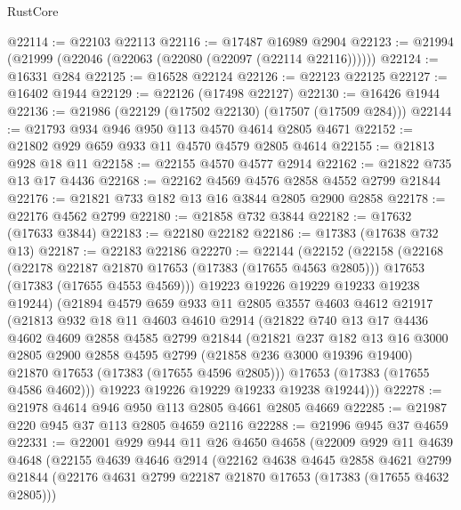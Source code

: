 \begin{lexlean}{RustCore}
\begin{coremodule}
@22114 := @22103 @22113
@22116 := @17487 @16989 @2904
@22123 := @21994 (@21999 (@22046 (@22063 (@22080 (@22097 (@22114 @22116))))))
@22124 := @16331 @284
@22125 := @16528 @22124
@22126 := @22123 @22125
@22127 := @16402 @1944
@22129 := @22126 (@17498 @22127)
@22130 := @16426 @1944
@22136 := @21986 (@22129 (@17502 @22130) (@17507 (@17509 @284)))
@22144 := @21793 @934 @946 @950 @113 @4570 @4614 @2805 @4671
@22152 := @21802 @929 @659 @933 @11 @4570 @4579 @2805 @4614
@22155 := @21813 @928 @18 @11
@22158 := @22155 @4570 @4577 @2914
@22162 := @21822 @735 @13 @17 @4436
@22168 := @22162 @4569 @4576 @2858 @4552 @2799 @21844
@22176 := @21821 @733 @182 @13 @16 @3844 @2805 @2900 @2858
@22178 := @22176 @4562 @2799
@22180 := @21858 @732 @3844
@22182 := @17632 (@17633 @3844)
@22183 := @22180 @22182
@22186 := @17383 (@17638 @732 @13)
@22187 := @22183 @22186
@22270 := @22144
    (@22152
      (@22158
        (@22168
          (@22178 @22187 @21870 @17653 (@17383 (@17655 @4563 @2805)))
          @17653
          (@17383 (@17655 @4553 @4569)))
        @19223
        @19226
        @19229
        @19233
        @19238
        @19244)
      (@21894
        @4579
        @659
        @933
        @11
        @2805
        @3557
        @4603
        @4612
        @21917
        (@21813
          @932
          @18
          @11
          @4603
          @4610
          @2914
          (@21822
            @740
            @13
            @17
            @4436
            @4602
            @4609
            @2858
            @4585
            @2799
            @21844
            (@21821
              @237
              @182
              @13
              @16
              @3000
              @2805
              @2900
              @2858
              @4595
              @2799
              (@21858 @236 @3000 @19396 @19400)
              @21870
              @17653
              (@17383 (@17655 @4596 @2805)))
            @17653
            (@17383 (@17655 @4586 @4602)))
          @19223
          @19226
          @19229
          @19233
          @19238
          @19244)))
@22278 := @21978 @4614 @946 @950 @113 @2805 @4661 @2805 @4669
@22285 := @21987 @220 @945 @37 @113 @2805 @4659 @2116
@22288 := @21996 @945 @37 @4659
@22331 := @22001
    @929
    @944
    @11
    @26
    @4650
    @4658
    (@22009
      @929
      @11
      @4639
      @4648
      (@22155
        @4639
        @4646
        @2914
        (@22162
          @4638
          @4645
          @2858
          @4621
          @2799
          @21844
          (@22176 @4631 @2799 @22187 @21870 @17653 (@17383 (@17655 @4632 @2805)))

\end{coremodule}
\end{lexlean}
